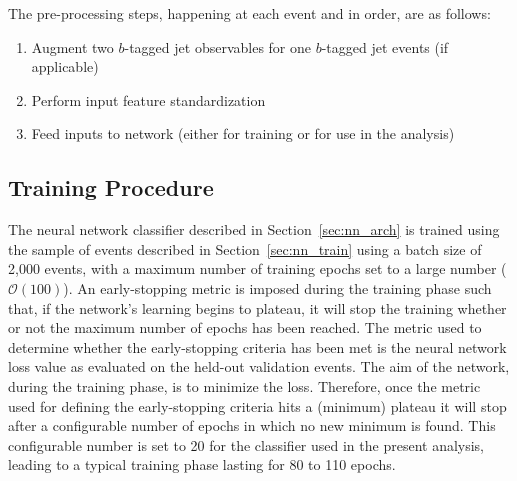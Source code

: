 The pre-processing steps, happening at each event and in order, are as follows:
\begin{enumerate}
    \item Augment two $b$-tagged jet observables for one $b$-tagged jet events (if applicable)
    \item Perform input feature standardization
    \item Feed inputs to network (either for training or for use in the analysis)
\end{enumerate}

%
%

\subsection{Training Procedure}
\label{sec:nn_train_procedure}

The neural network classifier described in Section~\ref{sec:nn_arch} is trained using the 
sample of events described in Section~\ref{sec:nn_train} using a batch size of 2,000 events,
with a maximum number of training epochs set to a large number ($\mathcal{O}(100)$).
An early-stopping metric is imposed during the training phase such that, if the network's learning
begins to plateau, it will stop the training whether or not the maximum number of epochs has been
reached.
The metric used to determine whether the early-stopping criteria has been met is the neural network
loss value as evaluated on the held-out validation events.
The aim of the network, during the training phase, is to minimize the loss.
Therefore, once the metric used for defining the early-stopping criteria hits a (minimum) plateau
it will stop after a configurable number of epochs in which no new minimum is found.
This configurable number is set to 20 for the classifier used in the present analysis, leading
to a typical training phase lasting for 80 to 110 epochs.

